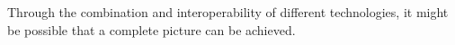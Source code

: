 Through the combination and interoperability of different technologies, it might be possible that a complete picture can be achieved.


